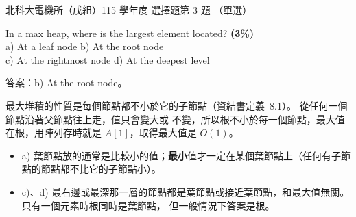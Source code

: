 \begin{pastexam}[label={px:ntut-115-ee-ds-13}]{北科大電機所（戊組）115 學年度 選擇題第 3 題}
（單選）

In a max heap, where is the largest element located? \textbf{(3\%)}\\
a) At a leaf node \hfill b) At the root node \hfill\null\\
c) At the rightmost node \hfill d) At the deepest level \hfill\null
\end{pastexam}

\begin{pastsoln}
答案：b) At the root node。

最大堆積的性質是每個節點都不小於它的子節點（資結書定義~8.1）。 從任何一個節點沿著父節點往上走，值只會變大或
不變，所以根不小於每一個節點，最大值在根，用陣列存時就是 $A[1]$，取得最大值是 $O(1)$。
\begin{itemize}
\item a) 葉節點放的通常是比較小的值；\textbf{最小}值才一定在某個葉節點上（任何有子節點的節點都不比它的子節點小）。
\item c)、d) 最右邊或最深那一層的節點都是葉節點或接近葉節點，和最大值無關。 只有一個元素時根同時是葉節點，
但一般情況下答案是根。
\end{itemize}
\end{pastsoln}
